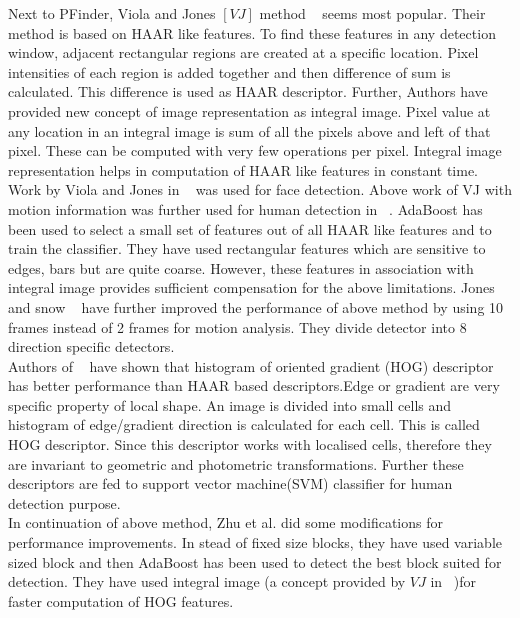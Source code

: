 \indent Next to PFinder, Viola and Jones $[VJ]$ method ~\cite{16, 17}
seems most popular. Their method is based on HAAR like features. To find
these features in any detection window, adjacent rectangular regions are
created at a specific location. Pixel intensities of each region is
added together and then difference of sum is calculated. This difference
is used as HAAR descriptor. Further, Authors have provided new concept
of image representation as integral image.  Pixel value at any location
in an integral image is sum of all the pixels above and left of that
pixel.  These can be computed with very few operations per pixel.
Integral image representation helps in computation of HAAR like features
in constant time.\\

\indent Work by Viola and Jones in ~\cite{17} was used for face
detection.  Above work of VJ with motion information was further used
for human detection in ~\cite{16}.  AdaBoost has been used to select a
small set of features out of all HAAR like features and to train the
classifier. They have used rectangular features which are sensitive to
edges, bars but are quite coarse. However, these features in association
with integral image provides sufficient compensation for the above
limitations. Jones and snow ~\cite{26} have further improved the
performance of above method by using 10 frames instead of 2 frames for
motion analysis. They divide detector into 8 direction specific
detectors.\\

\indent Authors of ~\cite{20, 21} have shown that histogram of oriented
gradient (HOG) descriptor has better performance than HAAR based
descriptors.Edge or gradient are very specific property of local shape.
An image is divided into small cells and histogram of edge/gradient
direction is calculated for each cell. This is called HOG descriptor.
Since this descriptor works with localised cells, therefore they are
invariant to geometric and photometric transformations. Further these
descriptors are fed to support vector machine(SVM) classifier for human
detection purpose.\\

\indent In continuation of above method, Zhu et al. did some
modifications for performance improvements. In stead of fixed size
blocks, they have used variable sized block and then AdaBoost has been
used to detect the best block suited for detection. They have used
integral image (a concept provided by $VJ$ in ~\cite{17})for faster
computation of HOG features.\\

